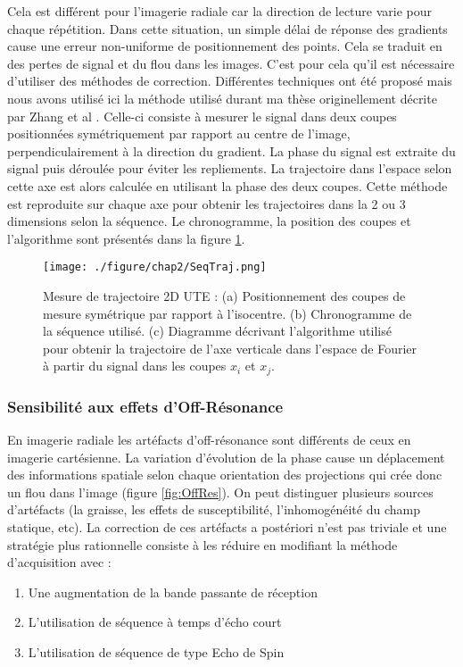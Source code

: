 Cela est différent pour l'imagerie radiale car la direction de lecture varie pour chaque répétition. Dans cette situation, un simple délai de réponse des gradients cause une erreur non-uniforme de positionnement des points. Cela se traduit en des pertes de signal et du flou dans les images. C'est pour cela qu'il est nécessaire d'utiliser des méthodes de correction. Différentes techniques ont été proposé \cite{Alley:1998vn,Addy:2012kx} mais nous avons utilisé ici la méthode utilisé durant ma thèse originellement décrite par Zhang et al \cite{Zhang:1998uq}.
Celle-ci consiste à mesurer le signal dans deux coupes positionnées symétriquement par rapport au centre de l'image, perpendiculairement à la direction du gradient. La phase du signal est extraite du signal puis déroulée pour éviter les repliements. La trajectoire dans l'espace selon cette axe est alors calculée en utilisant la phase des deux coupes. Cette méthode est reproduite sur chaque axe pour obtenir les trajectoires dans la 2 ou 3 dimensions selon la séquence. Le chronogramme, la position des coupes et l'algorithme sont présentés dans la figure \ref{fig:SeqTraj}.

\begin{figure}[H]
\centering
\texttt{[image: ./figure/chap2/SeqTraj.png]}
\caption[Méthode mesure trajectoire]{\label{fig:SeqTraj}  
Mesure de trajectoire 2D UTE : (a) Positionnement des coupes de mesure symétrique par rapport à l'isocentre. (b) Chronogramme de la séquence utilisé. (c) Diagramme décrivant l'algorithme utilisé pour obtenir la trajectoire de l'axe verticale dans l'espace de Fourier à partir du signal dans les coupes $x_i$ et $x_j$.}
\end{figure}

\subsubsection{Sensibilité aux effets d'Off-Résonance}

En imagerie radiale les artéfacts d'off-résonance sont différents de ceux en imagerie cartésienne. La variation d'évolution de la phase cause un déplacement des informations spatiale selon chaque orientation des projections qui crée donc un flou dans l'image (figure \ref{fig:OffRes}).
On peut distinguer plusieurs sources d'artéfacts (la graisse, les effets de susceptibilité, l'inhomogénéité du champ statique, etc). La correction de ces artéfacts a postériori n'est pas triviale et une stratégie plus rationnelle consiste à les réduire en modifiant la méthode d'acquisition avec :
\begin{enumerate}
\item Une augmentation de la bande passante de réception
\item L'utilisation de séquence à temps d'écho court
\item L'utilisation de séquence de type Echo de Spin
\end{enumerate}


